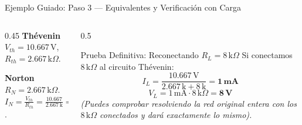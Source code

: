 \documentclass[aspectratio=169, table, xcdraw]{beamer}
\begin{document}
\begin{frame}{Ejemplo Guiado: Paso 3 — Equivalentes y Verificación con Carga}
    \begin{columns}
        \begin{column}{0.45\textwidth}
            \textbf{Thévenin} \\
            $V_{th} = 10.667\,\text{V}$, $R_{th} = 2.667\,\text{k}\Omega$.
            
            \vspace{0.2cm}
            \textbf{Norton} \\
            $R_N = 2.667\,\text{k}\Omega$. \\
            $I_N = \frac{V_{th}}{R_{th}} = \frac{10.667}{2.667\,\text{k}} = \mathbf{4\,\text{mA}}$.
        \end{column}
        \begin{column}{0.5\textwidth}
            \begin{block}{Prueba Definitiva: Reconectando $R_L = 8\,\text{k}\Omega$}
                Si conectamos $8\,\text{k}\Omega$ al circuito Thévenin:
                \begin{equation*}
                    I_L = \frac{10.667\,\text{V}}{2.667\,\text{k} + 8\,\text{k}} = \mathbf{1\,\text{mA}}
                \end{equation*}
                \begin{equation*}
                    V_L = 1\,\text{mA} \cdot 8\,\text{k}\Omega = \mathbf{8\,\text{V}}
                \end{equation*}
                \textit{(Puedes comprobar resolviendo la red original entera con los $8\,\text{k}\Omega$ conectados y dará exactamente lo mismo).}
            \end{block}
        \end{column}
    \end{columns}
\end{frame}
\end{document}
